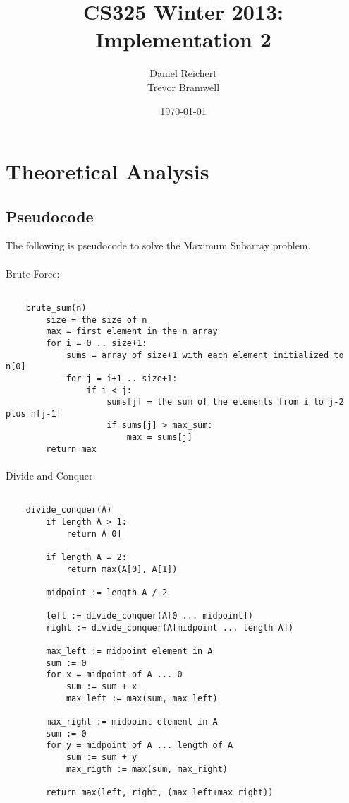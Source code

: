 \documentclass[12pt]{article}
\title{CS325 Winter 2013: Implementation 2}
\author{
    Daniel Reichert \\
    Trevor Bramwell
}
\date{\today}
\begin{document}
\maketitle

\section{Theoretical Analysis}
\subsection{Pseudocode}
    The following is pseudocode to solve the Maximum Subarray problem.
\paragraph{}
Brute Force:
    \begin{lstlisting}[basicstyle=\ttfamily\small,mathescape]

    brute_sum(n)
        size = the size of n
        max = first element in the n array
        for i = 0 .. size+1:
            sums = array of size+1 with each element initialized to n[0]
            for j = i+1 .. size+1:
                if i < j:
                    sums[j] = the sum of the elements from i to j-2 plus n[j-1]
                    if sums[j] > max_sum:
                        max = sums[j]
        return max

    \end{lstlisting}


\paragraph{}
Divide and Conquer:
    \begin{lstlisting}[basicstyle=\ttfamily\small,mathescape]

    divide_conquer(A)
        if length A > 1:
            return A[0]

        if length A = 2:
            return max(A[0], A[1])

        midpoint := length A / 2

        left := divide_conquer(A[0 ... midpoint])
        right := divide_conquer(A[midpoint ... length A])

        max_left := midpoint element in A
        sum := 0
        for x = midpoint of A ... 0
            sum := sum + x
            max_left := max(sum, max_left)

        max_right := midpoint element in A
        sum := 0
        for y = midpoint of A ... length of A
            sum := sum + y
            max_rigth := max(sum, max_right)

        return max(left, right, (max_left+max_right))

    \end{lstlisting}
        
\end{document}
